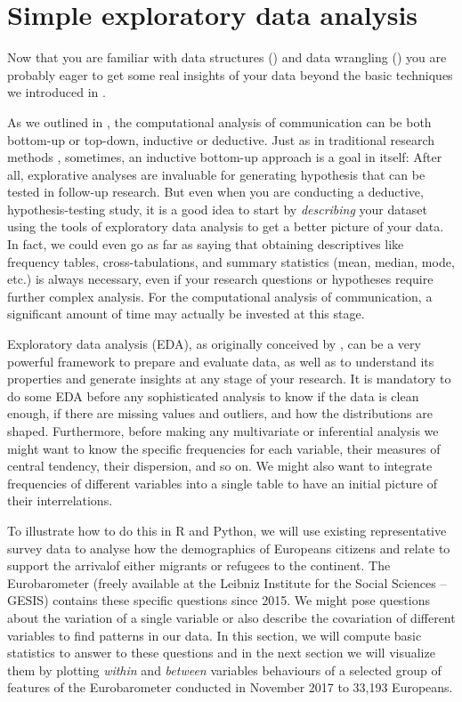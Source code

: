 \section{Simple exploratory data analysis}
\label{sec:simpleeda}

Now that you are familiar with data structures () and data wrangling () you are probably eager to get some real insights of your data beyond the basic techniques we introduced in .

As we outlined in , the computational analysis
of communication can be both bottom-up or top-down, inductive or
deductive.  Just as in traditional research methods \cite[for an
  overview, see, for example,][]{Bryman2012}, sometimes, an inductive
bottom-up approach is a goal in itself: After all, explorative
analyses are invaluable for generating hypothesis that can be tested
in follow-up research. But even when you are conducting a deductive,
hypothesis-testing study, it is a good idea to start by
\emph{describing} your dataset using the tools of exploratory data
analysis to get a better picture of your data. In fact, we could even
go as far as saying that obtaining descriptives like frequency tables,
cross-tabulations, and summary statistics (mean, median, mode, etc.)
is always necessary, even if your research questions or hypotheses
require further complex analysis. For the computational analysis of
communication, a significant amount of time may actually be invested
at this stage.

Exploratory data analysis (EDA), as originally conceived by \citet{tukey1977exploratory}, can be a very powerful framework to prepare and evaluate data, as well as to understand its properties and generate insights at any stage of your research.
It is mandatory to do some EDA before any sophisticated analysis to know if the data is clean enough, if there are missing values and outliers, and how the distributions are shaped.
Furthermore, before making any multivariate or inferential analysis we might want to know the specific frequencies for each variable, their measures of central tendency, their dispersion, and so on. We might also want to integrate frequencies of different variables into a single table to have an initial picture of their interrelations.

To illustrate how to do this in R and Python, we will use existing representative survey data to analyse how the demographics of Europeans citizens and relate to support the arrivalof  either migrants or refugees to the continent. The Eurobarometer (freely available at the Leibniz Institute for the Social Sciences -- GESIS) contains these specific questions since 2015. We might pose questions about the variation of a single variable or also describe the covariation of different variables to find patterns in our data. In this section, we will compute basic statistics to answer to these questions and in the next section we will visualize them by plotting \textit{within} and \textit{between} variables behaviours of a selected group of features of the Eurobarometer conducted in November 2017 to 33,193 Europeans. 

